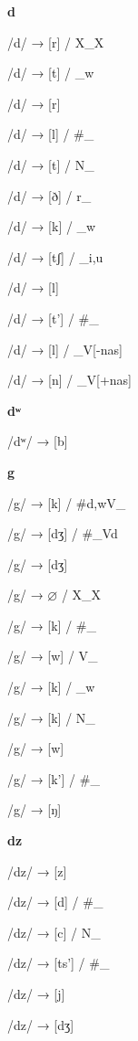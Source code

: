 \begin{center}\textbf{d}\end{center}
\begin{multicols}{4}
\noindent /d/ → [r] / X\_X

\noindent /d/ → [t] / \_w

\noindent /d/ → [r]

\noindent /d/ → [l] / \#\_

\noindent /d/ → [t] / N\_

\noindent /d/ → [ð] / r\_

\noindent /d/ → [k] / \_w

\noindent /d/ → [tʃ] / \_{i,u}

\noindent /d/ → [l]

\noindent /d/ → [t'] / \#\_

\noindent /d/ → [l] / \_V[-nas]

\noindent /d/ → [n] / \_V[+nas]

\end{multicols}

\begin{center}\textbf{dʷ}\end{center}
\begin{multicols}{4}
\noindent /dʷ/ → [b]

\end{multicols}

\begin{center}\textbf{g}\end{center}
\begin{multicols}{4}
\noindent /g/ → [k] / \#{d,w}V\_

\noindent /g/ → [dʒ] / \#\_Vd

\noindent /g/ → [dʒ]

\noindent /g/ → $\varnothing$ / X\_X

\noindent /g/ → [k] / \#\_

\noindent /g/ → [w] / V\_

\noindent /g/ → [k] / \_w

\noindent /g/ → [k] / N\_

\noindent /g/ → [w]

\noindent /g/ → [k'] / \#\_

\noindent /g/ → [ŋ]

\end{multicols}

\begin{center}\textbf{dz}\end{center}
\begin{multicols}{4}
\noindent /dz/ → [z]

\noindent /dz/ → [d] / \#\_

\noindent /dz/ → [c] / N\_

\noindent /dz/ → [ts'] / \#\_

\noindent /dz/ → [j]

\noindent /dz/ → [dʒ]

\end{multicols}

